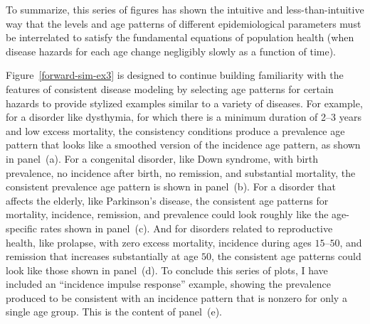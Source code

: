 To summarize, this series of figures has shown the intuitive and
less-than-intuitive way that the levels and age patterns of different
epidemiological parameters must be interrelated to satisfy the
fundamental equations of population health (when disease hazards for
each age change negligibly slowly as a function of time).

Figure~\ref{forward-sim-ex3} is designed to continue building familiarity with the
features of consistent disease modeling by selecting age patterns for
certain hazards to provide stylized examples similar to a variety of diseases.  For
example, for a disorder like dysthymia, for which there is a minimum duration of 2--3 years and low excess
mortality, the consistency conditions produce a prevalence age pattern
that looks like a smoothed version of the incidence age pattern, as shown in panel~(a).
For a congenital disorder, like Down syndrome, with birth
prevalence, no incidence after birth, no remission, and substantial
mortality, the consistent prevalence age pattern is shown in
panel~(b).
For a disorder that affects the elderly, like Parkinson's disease, the
consistent age patterns for mortality, incidence, remission, and
prevalence could look roughly like the age-specific rates shown in
panel~(c).
And for disorders related to reproductive health, like 
prolapse, with zero excess mortality, incidence during ages $15$--$50$, and
remission that increases substantially at age $50$, the consistent age
patterns could look like those shown in
panel~(d).
To conclude this series of plots, I have included an ``incidence impulse
response'' example, showing the prevalence produced to be consistent
with an incidence pattern that is nonzero for only a single
age group. This is the content of
panel~(e).


